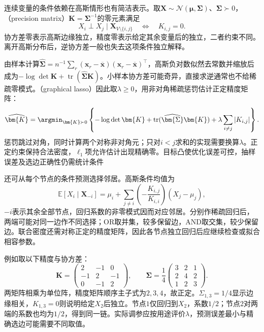 连续变量的条件依赖在高斯情形也有简洁表示。取$\bm{X}\sim\mathcal{N}(\bm{\mu},\bm{\Sigma})$、$\bm{\Sigma}\succ0$，（precision matrix）$\bm{K}=\bm{\Sigma}^{-1}$的零元素满足
\[
  X_i\perp X_j\mid\bm{X}_{V\setminus\{i,j\}}
  \quad\Longleftrightarrow\quad K_{i,j}=0.
\]
协方差零表示高斯边缘独立，精度零表示给定其余变量后的独立，二者约束不同。离开高斯分布后，逆协方差一般也失去这项条件独立解释。

由样本计算$\widehat{\bm{\Sigma}}=n^{-1}\sum_r(\bm{x}_r-\overline{\bm{x}})(\bm{x}_r-\overline{\bm{x}})^{\top}$，高斯负对数似然去常数并缩放后成为$-\log\det\bm{K}+\operatorname{tr}(\widehat{\bm{\Sigma}}\bm{K})$。小样本协方差可能奇异，直接求逆通常也不给稀疏零模式。（graphical lasso）因此取$\lambda\geq0$，用非对角稀疏惩罚估计正定精度矩阵：
\begin{equation}
  \widehat{\bm{K}}
  =\argmin_{\bm{K}\succ0}
    \left\{-\log\det\bm{K}
      +\operatorname{tr}(\widehat{\bm{\Sigma}}\bm{K})
      +\lambda\sum_{i\ne j}|K_{i,j}|\right\}.
  \label{eq:pgm-structure-learning-glasso}
\end{equation}
惩罚跳过对角，同时计算两个对称非对角元；只对$i<j$求和的实现需要换算$\lambda$。正定约束保持合法密度，$\ell_1$项允许估计出现精确零。目标凸使优化误差可控，抽样误差及选边正确性仍需统计条件

还可从每个节点的条件预测选择邻居。高斯条件均值为
\[
  \mathbb{E}[X_i\mid\bm{X}_{-i}]
  =\mu_i+\sum_{j\ne i}
    \left(-\frac{K_{i,j}}{K_{i,i}}\right)(X_j-\mu_j),
\]
$-i$表示其余全部节点，回归系数的非零模式因而对应邻居。分别作稀疏回归后，两端可能对同一边作不同选择；OR取并集，较多保留边，AND取交集，较少保留边。联合密度还需对称正定的精度矩阵，因此各节点独立回归后应继续检查或拟合相容参数。

例如取以下精度与协方差：
\[
  \bm{K}=
  \begin{pmatrix}
    2&-1&0\\
    -1&2&-1\\
    0&-1&2
  \end{pmatrix},
  \qquad
  \bm{\Sigma}=\frac14
  \begin{pmatrix}
    3&2&1\\
    2&4&2\\
    1&2&3
  \end{pmatrix}.
\]
两矩阵相乘为单位阵，精度矩阵顺序主子式为$2,3,4$，故正定。$\Sigma_{1,3}=1/4$显示边缘相关，$K_{1,3}=0$则说明给定$X_2$后独立。节点$1$仅回归到$X_2$，系数$1/2$；节点$2$对两端的系数也均为$1/2$，得到同一链。实际调参应按用途评价$\lambda$，预测误差最小与精确选边可能需要不同取值。


